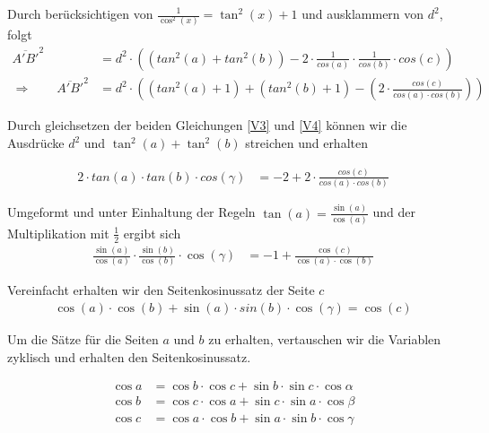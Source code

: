 \begin{refsection}
Durch berücksichtigen von $\frac{1}{\cos^{2}(x)}=\tan^{2}(x)+1$ und ausklammern von $d^2$, folgt
\begin{align}
\overline{ A'B'}^{ 2 } &= d^{ 2 } \cdot \left(\left(tan^{ 2 }(a) + tan^{ 2 }(b)\right) - 2 \cdot \frac{ 1 }{ cos(a)} \cdot \frac{ 1 }{ cos(b)} \cdot cos(c)\right) 
\nonumber \\
\Rightarrow \quad \quad
\overline{ A'B'}^{ 2 } &= d^{ 2 } \cdot \left(\left(tan^{ 2 }(a) + 1\right) + \left(tan^{ 2 }(b) + 1\right) - \left(2 \cdot \frac{cos(c)}{cos(a) \cdot cos(b)}\right)\right)
\label {V4}
\end{align}

Durch gleichsetzen der beiden Gleichungen \eqref{V3} und \eqref{V4} können wir die Ausdrücke $d^2$ und $\tan^2(a) + \tan^2(b)$ streichen und erhalten

\begin{align*}
2 \cdot tan(a) \cdot tan(b) \cdot cos(\gamma) &= -2+2 \cdot \frac{cos(c)}{cos(a) \cdot cos(b)}
\end{align*}


Umgeformt und unter Einhaltung der Regeln $\tan(a)=\frac{\sin(a)}{\cos(a)}$ und der Multiplikation mit $\frac{1}{2}$ ergibt sich
\begin{align*}
\frac{\sin(a)}{\cos(a)} \cdot \frac{\sin(b)}{\cos(b)} \cdot \cos(\gamma) &= -1 + \frac{\cos(c)}{\cos(a) \cdot \cos(b)}
\end{align*}

Vereinfacht erhalten wir den Seitenkosinussatz der Seite $c$
\begin{align*}
\cos(a) \cdot \cos(b) + \sin(a) \cdot sin(b) \cdot \cos(\gamma) = \cos(c)
\end{align*}

Um die Sätze für die Seiten $a$ und $b$ zu erhalten, vertauschen wir die Variablen zyklisch und erhalten den Seitenkosinussatz.

\begin{satz}
\label{skript:kugel:satz:Seitenkosinussatz}
\end{satz}

\begin{align*}
{\cos a} &= {\cos b} \cdot {\cos c} + {\sin b} \cdot {\sin c} \cdot {\cos \alpha}\\
{\cos b} &= {\cos c} \cdot {\cos a} + {\sin c} \cdot {\sin a} \cdot {\cos \beta}\\
{\cos c} &= {\cos a} \cdot {\cos b} + {\sin a} \cdot {\sin b} \cdot {\cos \gamma}\\
\end{align*}


\end{refsection}
